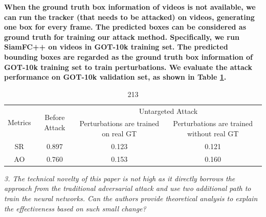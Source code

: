 \documentclass[12pt]{article}
\begin{document}
\textbf{
When the ground truth box information of videos is not available, we can run the tracker (that needs to be attacked) on videos, generating one box for every frame. The predicted boxes can be considered as ground truth for training our attack method.
Specifically, we run SiamFC++ on videos in GOT-10k training set. The predicted bounding boxes are regarded as the ground truth box information of GOT-10k training set to train perturbations. We evaluate the attack performance on GOT-10k validation set, as shown in Table \ref{tab:agent}.}

\begin{table}
    \centering
    \caption{213}
    \begin{tabular}{cccc}
        \toprule
        \multirow{2}{*}{Metrics} & \multirow{2}{*}{Before Attack} & \multicolumn{2}{c}{Untargeted Attack}                                            \\
                                 &                                & Perturbations are trained on real GT & Perturbations are trained without real GT \\ \midrule
        SR                       & 0.897                          & 0.123                                & 0.121                                     \\
        AO                       & 0.760                          & 0.153                                & 0.160                                     \\                              
        \bottomrule
    \end{tabular}
    \label{tab:agent}
\end{table}

\textit{3. The technical novelty of this paper is not high as it directly borrows the approach from the traditional adversarial attack and use two additional path to train the neural networks. Can the authors provide theoretical analysis to explain the effectiveness based on such small change?}
\end{document}
